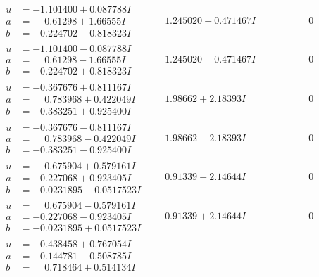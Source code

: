\documentclass[1p]{elsarticle_modified}
\theoremstyle{definition}
\begin{document}
$$\begin{array}{c|c|c}
\begin{aligned}
u &= -1.101400 + 0.087788 I \\
a &= \phantom{-}0.61298 + 1.66555 I \\
b &= -0.224702 - 0.818323 I\end{aligned}
 & \phantom{-}1.245020 - 0.471467 I & \phantom{-0.000000 } 0 \\ \hline\begin{aligned}
u &= -1.101400 - 0.087788 I \\
a &= \phantom{-}0.61298 - 1.66555 I \\
b &= -0.224702 + 0.818323 I\end{aligned}
 & \phantom{-}1.245020 + 0.471467 I & \phantom{-0.000000 } 0 \\ \hline\begin{aligned}
u &= -0.367676 + 0.811167 I \\
a &= \phantom{-}0.783968 + 0.422049 I \\
b &= -0.383251 + 0.925400 I\end{aligned}
 & \phantom{-}1.98662 + 2.18393 I & \phantom{-0.000000 } 0 \\ \hline\begin{aligned}
u &= -0.367676 - 0.811167 I \\
a &= \phantom{-}0.783968 - 0.422049 I \\
b &= -0.383251 - 0.925400 I\end{aligned}
 & \phantom{-}1.98662 - 2.18393 I & \phantom{-0.000000 } 0 \\ \hline\begin{aligned}
u &= \phantom{-}0.675904 + 0.579161 I \\
a &= -0.227068 + 0.923405 I \\
b &= -0.0231895 - 0.0517523 I\end{aligned}
 & \phantom{-}0.91339 - 2.14644 I & \phantom{-0.000000 } 0 \\ \hline\begin{aligned}
u &= \phantom{-}0.675904 - 0.579161 I \\
a &= -0.227068 - 0.923405 I \\
b &= -0.0231895 + 0.0517523 I\end{aligned}
 & \phantom{-}0.91339 + 2.14644 I & \phantom{-0.000000 } 0 \\ \hline\begin{aligned}
u &= -0.438458 + 0.767054 I \\
a &= -0.144781 - 0.508785 I \\
b &= \phantom{-}0.718464 + 0.514134 I\end{aligned}

\end{array}$$
\end{document}
